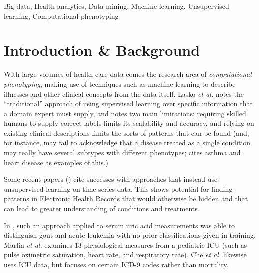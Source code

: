 \documentclass[journal]{IEEEtran}
\begin{document}
\begin{IEEEkeywords}
Big data, Health analytics, Data mining, Machine learning,
Unsupervised learning, Computational phenotyping
\end{IEEEkeywords}
%

\section{Introduction \& Background}

With large volumes of health care data comes the research area of
\emph{computational phenotyping}\cite{Che2015}, making use of
techniques such as machine learning to describe illnesses and other
clinical concepts from the data itself.  Lasko \emph{et
  al.}\cite{Lasko2013} notes the ``traditional'' approach of using
supervised learning over specific information that a domain expert
must supply, and notes two main limitations: requiring skilled humans
to supply correct labels limits its scalability and accuracy, and
relying on existing clinical descriptions limits the sorts of patterns
that can be found (and, for instance, may fail to acknowledge that a
disease treated as a single condition may really have several subtypes
with different phenotypes; \cite{Lasko2013} cites asthma and heart
disease as examples of this.)

Some recent papers (\cite{Marlin,Lasko2013,Johnson2016}) cite
successes with approaches that instead use unsupervised learning on
time-series data.  This shows potential for finding patterns in
Electronic Health Records that would otherwise be hidden and that can
lead to greater understanding of conditions and treatments.

In \cite{Lasko2013}, such an approach applied to serum uric acid
measurements was able to distinguish gout and acute leukemia with no
prior classifications given in training.  Marlin \emph{et
  al.}\cite{Marlin} examines 13 physiological measures from a
pediatric ICU (such as pulse oximetric saturation, heart rate, and
respiratory rate). Che \emph{et al.}\cite{Che2015} likewise uses ICU
data, but focuses on certain ICD-9 codes rather than mortality.
\end{document}
